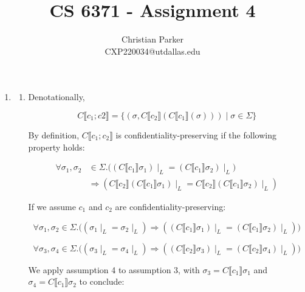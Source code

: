\documentclass{article}
\title{CS 6371 - Assignment 4}
\author{Christian Parker \\ CXP220034@utdallas.edu}
\begin{document}
\maketitle
\begin{enumerate}
    \item %
    \begin{enumerate}
        \item %
        Denotationally,

        \begin{equation}
            C \llbracket c_1 ; c2 \rrbracket = \{ (\sigma, C \llbracket c_2 \rrbracket (C \llbracket c_1 \rrbracket (\sigma))) \mid \sigma \in \Sigma \}
        \end{equation}

        By definition, \( C \llbracket c_1 ; c_2 \rrbracket \) is confidentiality-preserving if the following property holds:

        \begin{equation}
            \begin{aligned}
                \forall \sigma_1, \sigma_2 & \in \Sigma. \big((C \llbracket c_1 \rrbracket \sigma_1) \mid_L = (C \llbracket c_1 \rrbracket \sigma_2) \mid_L \big) \\
                &\Longrightarrow (C \llbracket c_2 \rrbracket (C \llbracket c_1 \rrbracket \sigma_1) \mid_L = C \llbracket c_2 \rrbracket (C \llbracket c_1 \rrbracket \sigma_2) \mid_L)
            \end{aligned}
        \end{equation}

        If we assume \( c_1 \) and \( c_2 \) are confidentiality-preserving:

        \begin{equation}
            \forall \sigma_1, \sigma_2 \in \Sigma. \big((\sigma_1 \mid_L = \sigma_2 \mid_L) \Longrightarrow ((C \llbracket c_1 \rrbracket \sigma_1) \mid_L = (C \llbracket c_1 \rrbracket \sigma_2) \mid_L)\big)
        \end{equation}

        \begin{equation}
            \forall \sigma_3, \sigma_4 \in \Sigma. \big((\sigma_3 \mid_L = \sigma_4 \mid_L) \Longrightarrow ((C \llbracket c_2 \rrbracket \sigma_3) \mid_L = (C \llbracket c_2 \rrbracket \sigma_4) \mid_L) \big)
        \end{equation}

        We apply assumption 4 to assumption 3, with
        \( \sigma_3 = C \llbracket c_1 \rrbracket \sigma_1 \)
        and
        \( \sigma_4 = C \llbracket c_1 \rrbracket \sigma_2 \)
        to conclude:


\end{enumerate}
\end{enumerate}
\end{document}
